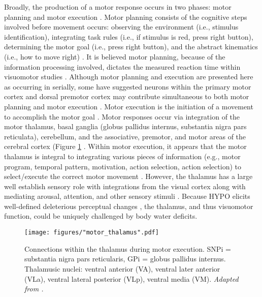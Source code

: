Broadly, the production of a motor response occurs in two phases: motor planning and motor execution \cite{crammond_prior_2000}. Motor planning consists of the cognitive steps involved before movement occurs: observing the environment (i.e., stimulus identification), integrating task rules (i.e., if stimulus is red, press right button), determining the motor goal (i.e., press right button), and the abstract kinematics (i.e., how to move right) \cite{wong_motor_2015}. It is believed motor planning, because of the information processing involved, dictates the measured reaction time within visuomotor studies \cite{wong_motor_2015}. Although motor planning and execution are presented here as occurring in serially, some have suggested neurons within the primary motor cortex and dorsal premotor cortex may contribute simultaneous to both motor planning and motor execution \cite{crammond_prior_2000}. Motor execution is the initiation of a movement to accomplish the motor goal \cite{kaufman_roles_2013}. Motor responses occur via integration of the motor thalamus, basal ganglia (globus pallidus internus, substantia nigra pars reticulata), cerebellum, and the associative, premotor, and motor areas of the cerebral cortex (Figure \ref{fig:motor_thalamus} \cite{rizzolatti_organization_1998,bosch-bouju_motor_2013}. Within motor execution, it appears that the motor thalamus is integral to integrating various pieces of information (e.g., motor program, temporal pattern, motivation, action selection, action selection) to select/execute the correct motor movement \cite{bosch-bouju_motor_2013}. However, the thalamus has a large well establish sensory role with integrations from the visual cortex along with mediating arousal, attention, and other sensory stimuli \cite{nakajima_thalamic_2017}. Because HYPO elicits well-defined deleterious perceptual changes \cite{engell_thirst_1987,armstrong_mild_2012,lieberman_severe_2005}, the thalamus, and thus visuomotor function, could be uniquely challenged by body water deficits. 

\begin{figure}
	\centering
	\texttt{[image: figures/"motor\_thalamus".pdf]}
	\caption{Connections within the thalamus during motor execution. SNPi = substantia nigra pars reticularis, GPi = globus pallidus internus. Thalamusic nuclei: ventral anterior (VA), ventral later anterior (VLa), ventral lateral posterior (VLp), ventral media (VM). \textit{Adapted from \cite{bosch-bouju_motor_2013}.}}
	\label{fig:motor_thalamus}
\end{figure}

